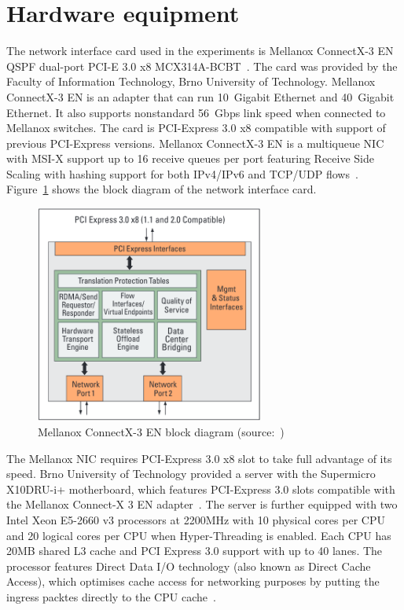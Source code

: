 
\section{Hardware equipment}\label{sec:analysis-hardware}
The network interface card used in the experiments is
Mellanox ConnectX-3 EN QSPF dual-port PCI-E 3.0 x8 MCX314A-BCBT~\cite{mellanox-product-brief}.
The card was provided by the Faculty of Information Technology, Brno University of Technology.
Mellanox ConnectX-3 EN is an adapter that can run 10~Gigabit Ethernet and 40~Gigabit Ethernet.
It also supports nonstandard 56~Gbps link speed when connected to Mellanox switches.
The card is PCI-Express 3.0 x8 compatible with support of previous PCI-Express versions.
Mellanox ConnectX-3 EN is a multiqueue NIC with MSI-X support up to 16 receive queues per port
featuring Receive Side Scaling with hashing support for both IPv4/IPv6 and TCP/UDP flows~\cite{mellanox-silicon, mellanox-user-manual}.
Figure~\ref{fig:setup-mlx-block-diagram} shows the block diagram of the network interface card.

\begin{figure}
	\centering
	\includegraphics[width=7.5cm,keepaspectratio]{fig/mlx-block-diagram.png}
	\caption{Mellanox ConnectX-3 EN block diagram (source:~\cite{mellanox-silicon})}
	\label{fig:setup-mlx-block-diagram}
	\bigskip
\end{figure}

The Mellanox NIC requires PCI-Express 3.0 x8 slot to take full advantage of its speed.
Brno University of Technology provided a server with
the Supermicro X10DRU-i+ motherboard, which
features PCI-Express 3.0 slots compatible with the Mellanox Connect-X 3 EN adapter~\cite{supermicro-board}.
The server is further equipped with two Intel Xeon E5-2660 v3 processors at 2200MHz with 10 physical cores per CPU
and 20 logical cores per CPU when Hyper-Threading is enabled.
Each CPU has 20MB shared L3 cache and PCI Express 3.0 support with up to 40 lanes.
The processor features Direct Data I/O technology (also known as Direct Cache Access),
which optimises cache access for networking purposes by putting the ingress packtes directly to the CPU cache~\cite{intel-xeon-cpu}.

